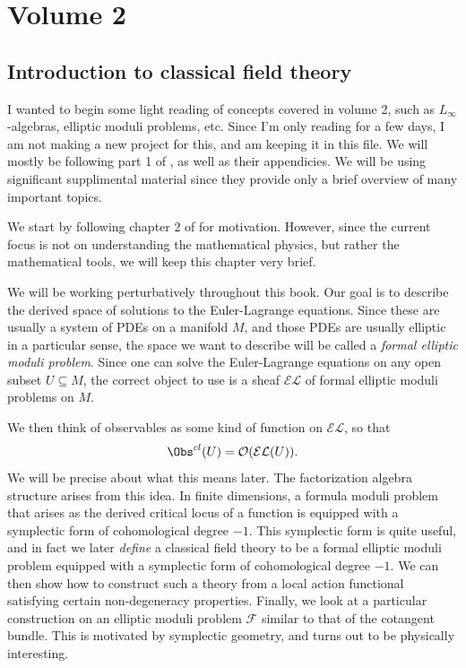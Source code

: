 \part{Volume 2}

\chapter{Introduction to classical field theory}

I wanted to begin some light reading of concepts covered in volume 2, such as $L_\infty $-algebras, elliptic moduli problems, etc. Since I'm only reading for a few days, I am not making a new project for this, and am keeping it in this file. We will mostly be following part 1 of \cite{cg2}, as well as their appendicies. We will be using significant supplimental material since they provide only a brief overview of many important topics.

We start by following chapter 2 of \cite{cg2} for motivation. However, since the current focus is not on understanding the mathematical physics, but rather the mathematical tools, we will keep this chapter very brief.

We will be working perturbatively throughout this book. Our goal is to describe the derived space of solutions to the Euler-Lagrange equations. Since these are usually a system of PDEs on a manifold $M$, and those PDEs are usually elliptic in a particular sense, the space we want to describe will be called a \emph{formal elliptic moduli problem}. Since one can solve the Euler-Lagrange equations on any open subset $U\subseteq M$, the correct object to use is a sheaf $\mathcal{EL} $ of formal elliptic moduli problems on $M$.

We then think of observables as some kind of function on $\mathcal{E} \mathcal{L} $, so that
\[
	\Obs^{cl} (U) = \mathcal{O} (\mathcal{E} \mathcal{L} (U))
.\]
We will be precise about what this means later. The factorization algebra structure arises from this idea. In finite dimensions, a formula moduli problem that arises as the derived critical locus of a function is equipped with a symplectic form of cohomological degree $-1$. This symplectic form is quite useful, and in fact we later \emph{define} a classical field theory to be a formal elliptic moduli problem equipped with a symplectic form of cohomological degree $-1$. We can then show how to construct such a theory from a local action functional satisfying certain non-degeneracy properties. Finally, we look at a particular construction on an elliptic moduli problem $\mathcal{F} $ similar to that of the cotangent bundle. This is motivated by symplectic geometry, and turns out to be physically interesting.

